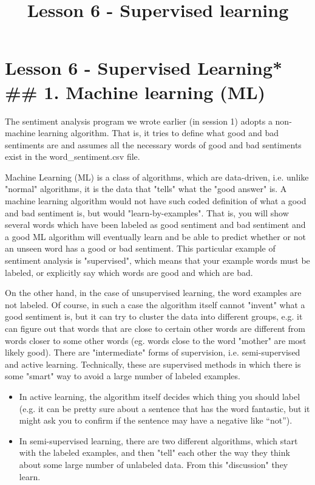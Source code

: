 \documentclass[11pt]{article}
\title{Lesson 6 - Supervised learning}
\providecommand{\tightlist}{%
      \setlength{\itemsep}{0pt}\setlength{\parskip}{0pt}}
\begin{document}
    
    
    \maketitle
    
    

    
    \section{Lesson 6 - Supervised Learning* \#\# 1. Machine learning
(ML)}\label{lesson-6---supervised-learning-1.-machine-learning-ml}

The sentiment analysis program we wrote earlier (in session 1) adopts a
non-machine learning algorithm. That is, it tries to define what good
and bad sentiments are and assumes all the necessary words of good and
bad sentiments exist in the word\_sentiment.csv file.

Machine Learning (ML) is a class of algorithms, which are data-driven,
i.e. unlike "normal" algorithms, it is the data that "tells" what the
"good answer" is. A machine learning algorithm would not have such coded
definition of what a good and bad sentiment is, but would
"learn-by-examples". That is, you will show several words which have
been labeled as good sentiment and bad sentiment and a good ML algorithm
will eventually learn and be able to predict whether or not an unseen
word has a good or bad sentiment. This particular example of sentiment
analysis is "supervised", which means that your example words must be
labeled, or explicitly say which words are good and which are bad.

On the other hand, in the case of unsupervised learning, the word
examples are not labeled. Of course, in such a case the algorithm itself
cannot "invent" what a good sentiment is, but it can try to cluster the
data into different groups, e.g. it can figure out that words that are
close to certain other words are different from words closer to some
other words (eg. words close to the word "mother" are most likely good).
There are "intermediate" forms of supervision, i.e. semi-supervised and
active learning. Technically, these are supervised methods in which
there is some "smart" way to avoid a large number of labeled examples.

\begin{itemize}
\tightlist
\item
  In active learning, the algorithm itself decides which thing you
  should label (e.g. it can be pretty sure about a sentence that has the
  word fantastic, but it might ask you to confirm if the sentence may
  have a negative like ``not'').
\item
  In semi-supervised learning, there are two different algorithms, which
  start with the labeled examples, and then "tell" each other the way
  they think about some large number of unlabeled data. From this
  "discussion" they learn.
\end{itemize}
\end{document}
